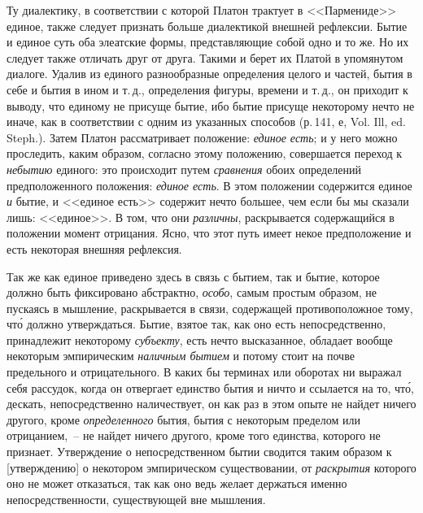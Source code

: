 Ту диалектику, в соответствии с которой Платон трактует
в <<Пармениде>> единое, также следует признать больше
диалектикой внешней рефлексии. Бытие и единое
суть оба элеатские формы, представляющие собой одно и
то же. Но их следует также отличать друг от друга. Такими
и берет их Платой в упомянутом диалоге. Удалив
из единого разнообразные определения целого и частей,
бытия в себе и бытия в ином и т.\,д., определения фигуры,
времени и т.\,д., он приходит к выводу, что единому не
присуще бытие, ибо бытие присуще некоторому нечто не
иначе, как в соответствии с одним из указанных способов
(р.\,141, е, Vol. Ill, ed. Steph.)\endnotemark{}. Затем Платон рассматривает
положение: \emph{единое есть}; и у него можно проследить,
каким образом, согласно этому положению, совершается
переход к \emph{небытию} единого: это происходит путем
\emph{сравнения} обоих определений предположенного положения:
\emph{единое есть}. В этом положении содержится единое
\emph{и} бытие, и <<единое есть>> содержит нечто большее, чем
если бы мы сказали лишь: <<единое>>. В том, что они \emph{различны},
раскрывается содержащийся в положении момент
отрицания. Ясно, что этот путь имеет некое предположение
и есть некоторая внешняя рефлексия.


Так же как единое приведено здесь в связь с бытием,
так и бытие, которое должно быть фиксировано абстрактно,
\emph{особо}, самым простым образом, не пускаясь в
мышление, раскрывается в связи, содержащей противоположное
тому, чт\'о должно утверждаться. Бытие, взятое
так, как оно есть непосредственно, принадлежит некоторому
\emph{субъекту}, есть нечто высказанное, обладает вообще
некоторым эмпирическим \emph{наличным бытием} и потому
стоит на почве предельного и отрицательного. В каких
бы терминах или оборотах ни выражал себя рассудок,
когда он отвергает единство бытия и ничто и ссылается
на то, чт\'о, дескать, непосредственно наличествует, он как
раз в этом опыте не найдет ничего другого, кроме \emph{определенного}
бытия, бытия с некоторым пределом или отрицанием,~--
не найдет ничего другого, кроме того единства,
которого не признает. Утверждение о непосредственном
бытии сводится таким образом к [утверждению] о
некотором эмпирическом существовании, от \emph{раскрытия}
которого оно не может отказаться, так как оно ведь желает
держаться именно непосредственности, существующей
вне мышления.

